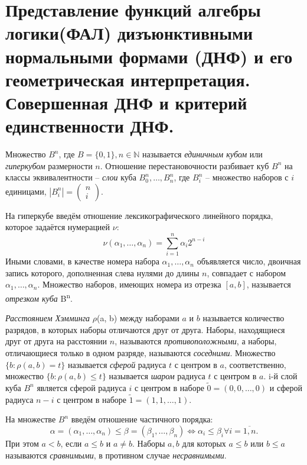 \documentclass[11pt]{article}
\author{Sergey Makarov}
\date{\today}
\title{}
\newcounter{th}\setcounter{th}{0}
\begin{document}
\tableofcontents

\pagebreak
\section{Представление функций алгебры логики(ФАЛ) дизъюнктивными нормальными формами (ДНФ) и его геометрическая интерпретация. Совершенная ДНФ и критерий единственности ДНФ.}
\label{sec:org525808a}
Множество \(B^n\), где \(B = \{0, 1\}, n \in \mathbb{N}\) называется \emph{единичным кубом} или \emph{гиперкубом} размерности \(n\). Отношение перестановочности разбивает куб \(B^n\) на классы эквивалентности -- \emph{слои} куба \(B_0^n, \ldots, B_n^n\), где \(B_i^n\) -- множество наборов с \(i\) единицами, \(|B_i^n| = \begin{pmatrix}n \\ i\end{pmatrix}\).

На гиперкубе введём отношение лексикографического линейного порядка, которое задаётся нумерацией \(\nu\):
\begin{equation*}
\nu(\alpha_1, \ldots, \alpha_n) = \sum_{i = 1}^n\alpha_i2^{n - i}
\end{equation*}
Иными словами, в качестве номера набора \(\alpha_1, \ldots, \alpha_n\) объявляется число, двоичная запись которого, дополненная слева нулями до длины \(n\), совпадает с набором \(\alpha_1, \ldots, \alpha_n\). Множество наборов, имеющих номера из отрезка \([a, b]\), называется \emph{отрезком куба} B\textsuperscript{n}.

\emph{Расстоянием Хэмминга} \(\rho\)(a, b) между наборами \(a\) и \(b\) называется количество разрядов, в которых наборы отличаются друг от друга. Наборы, находящиеся друг от друга на расстоянии \(n\), называются \emph{противоположными}, а наборы, отличающиеся только в одном разряде, называются \emph{соседними}. Множество \(\{b: \rho(a, b) = t\}\) называется \emph{сферой} радиуса \(t\) с центром в \(a\), соответственно, множество \(\{b: \rho(a, b) \leq t\}\) называется \emph{шаром} радиуса \(t\) с центром в \(a\). i-й слой куба \(B^n\) является сферой радиуса \(i\) с центром в наборе \(\widetilde{0} = (0, 0, \ldots, 0)\) и сферой радиуса \(n - i\) с центром в наборе \(\widetilde{1} = (1, 1, \ldots, 1)\).

На множестве \(B^n\) введём отношение частичного порядка:
\begin{equation*}
\alpha = (\alpha_1, \ldots, \alpha_n) \leq \beta = (\beta_1, \ldots, \beta_n) \Leftrightarrow \alpha_i \leq \beta_i \forall i = \overline{1, n}.
\end{equation*}
При этом \(a < b\), если \(a \leq b\)  и \(a \neq b\). Наборы \(a, b\) для которых \(a \leq b\) или \(b \leq a\) называются \emph{сравнимыми}, в противном случае \emph{несравнимыми}.
\end{document}

